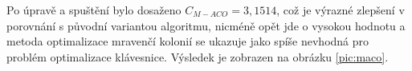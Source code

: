 \documentclass[a4paper, twoside, 12pt, czech]{article}
\begin{document}

Po úpravě a spuštění bylo dosaženo $C_{M-ACO} = 3,1514$, což je výrazné zlepšení 
v porovnání s původní variantou algoritmu, nicméně opět jde o vysokou hodnotu a 
metoda optimalizace mravenčí kolonií se ukazuje jako spíše nevhodná pro problém 
optimalizace klávesnice. Výsledek je zobrazen na obrázku \ref{pic:maco}.
\end{document}
